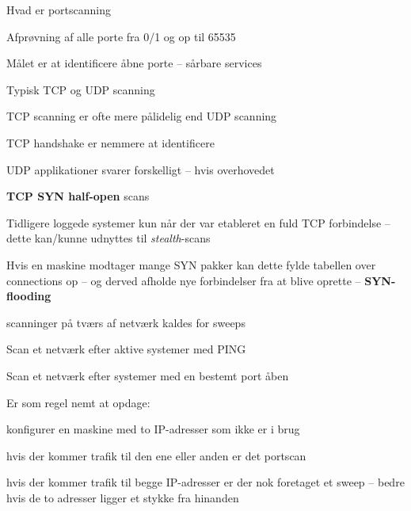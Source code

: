 \documentclass[20pt,landscape,a4paper,footrule]{foils}
\begin{document}

\begin{list1}
\item Hvad er portscanning
\item Afprøvning af alle porte fra 0/1 og op til 65535
\item Målet er at identificere åbne porte -- sårbare services
\item Typisk TCP og UDP scanning
\item TCP scanning er ofte mere pålidelig end UDP scanning
\end{list1}

{\hlkbig TCP handshake er nemmere at identificere

UDP applikationer svarer forskelligt -- hvis overhovedet}



\begin{list2}
\item {\bfseries TCP SYN half-open} scans
\item Tidligere loggede systemer kun når der var etableret en fuld TCP
  forbindelse -- dette kan/kunne udnyttes til \emph{stealth}-scans
\item Hvis en maskine modtager mange SYN pakker kan dette fylde
  tabellen over connections op -- og derved afholde nye forbindelser
  fra at blive oprette -- {\bfseries SYN-flooding}
\end{list2}



\begin{list1}
\item scanninger på tværs af netværk kaldes for sweeps
\item Scan et netværk efter aktive systemer med PING
\item Scan et netværk efter systemer med en bestemt port åben
\item Er som regel nemt at opdage:
  \begin{list2}
    \item konfigurer en maskine med to IP-adresser som ikke er i brug
\item hvis der kommer trafik til den ene eller anden er det portscan
\item hvis der kommer trafik til begge IP-adresser er der nok
  foretaget et sweep -- bedre hvis de to adresser ligger et stykke fra hinanden
  \end{list2}

\end{list1}
\end{document}
